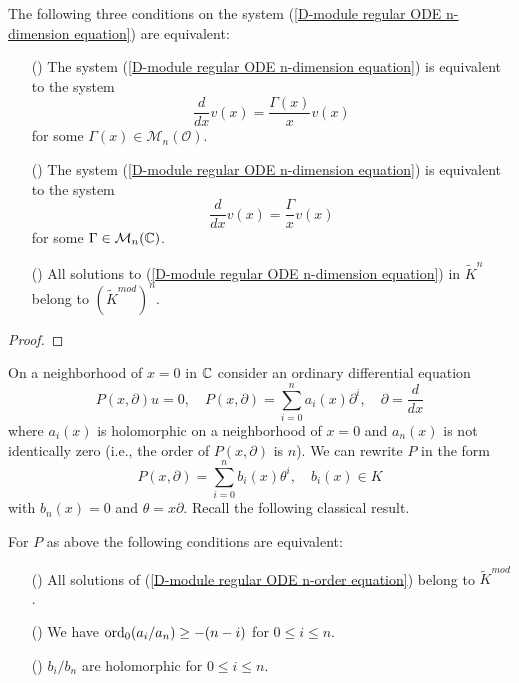 \begin{theorem}\label{D-module ODE n-dimension equation regular def}
The following three conditions on the system (\ref{D-module regular ODE n-dimension equation}) are equivalent:
\begin{enumerate}
    \item[(\rmnum{1})] The system (\ref{D-module regular ODE n-dimension equation}) is equivalent to the system
    \[\frac{d}{dx}v(x)=\frac{\Gamma(x)}{x}v(x)\]
    for some $\Gamma(x)\in\mathcal{M}_n(\mathscr{O})$.
    \item[(\rmnum{2})] The system (\ref{D-module regular ODE n-dimension equation}) is equivalent to the system
    \[\frac{d}{dx}v(x)=\frac{\Gamma}{x}v(x)\]
    for some $\Gamma\in\mathcal{M}_n(\mathbb{C})$.
    \item[(\rmnum{3})] All solutions to (\ref{D-module regular ODE n-dimension equation}) in $\widetilde{K}^n$ belong to $(\widetilde{K}^{mod})^n$.
\end{enumerate}
\end{theorem}
\begin{proof}

\end{proof}

On a neighborhood of $x=0$ in $\mathbb{C}$ consider an ordinary differential equation
\begin{equation}\label{D-module regular ODE n-order equation}
P(x,\partial)u=0,\quad P(x,\partial)=\sum_{i=0}^{n}a_i(x)\partial^i,\quad \partial=\frac{d}{dx}
\end{equation}
where $a_i(x)$ is holomorphic on a neighborhood of $x=0$ and $a_n(x)$ is not identically zero (i.e., the order of $P(x,\partial)$ is $n$). We can rewrite $P$ in the form
\[P(x,\partial)=\sum_{i=0}^{n}b_i(x)\theta^i,\quad b_i(x)\in K\]
with $b_n(x)=0$ and $\theta=x\partial$. Recall the following classical result.
\begin{theorem}[Fuchs, 1866]\label{D-module ODE n-order regular def}
For $P$ as above the following conditions are equivalent:
\begin{enumerate}
    \item[(\rmnum{1})] All solutions of (\ref{D-module regular ODE n-order equation}) belong to $\widetilde{K}^{mod}$.
    \item[(\rmnum{2})] We have $\mathrm{ord}_0(a_i/a_n)\geq-(n-i)$ for $0\leq i\leq n$.
    \item[(\rmnum{3})] $b_i/b_n$ are holomorphic for $0\leq i\leq n$.
\end{enumerate}
\end{theorem}

